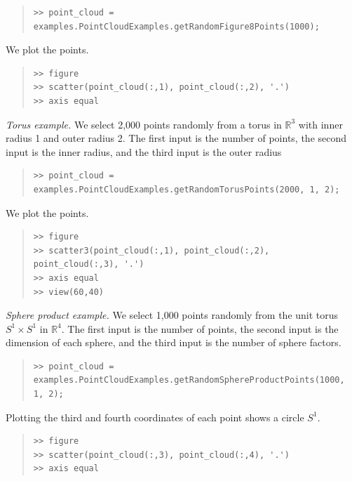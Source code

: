 \documentclass[amscd, amssymb, verbatim]{amsart}[12pt]
\theoremstyle{remark}
\theoremstyle{remark}
\theoremstyle{remark}
\begin{document}
\begin{quote} \begin{verbatim}
>> point_cloud = examples.PointCloudExamples.getRandomFigure8Points(1000);
\end{verbatim} \end{quote}

We plot the points.

\begin{quote} \begin{verbatim}
>> figure
>> scatter(point_cloud(:,1), point_cloud(:,2), '.')
>> axis equal
\end{verbatim} \end{quote}

{\em Torus example.} We select 2,000 points randomly from a torus in $\mathbb{R}^3$ with inner radius 1 and outer radius 2. The first input is the number of points, the second input is the inner radius, and the third input is the outer radius

\begin{quote} \begin{verbatim}
>> point_cloud = examples.PointCloudExamples.getRandomTorusPoints(2000, 1, 2);
\end{verbatim} \end{quote}

We plot the points.

\begin{quote} \begin{verbatim}
>> figure
>> scatter3(point_cloud(:,1), point_cloud(:,2), point_cloud(:,3), '.')
>> axis equal
>> view(60,40)
\end{verbatim} \end{quote}

{\em Sphere product example.} We select 1,000 points randomly from the unit torus $S^1 \times S^1$ in $\mathbb{R}^4$. The first input is the number of points, the second input is the dimension of each sphere, and the third input is the number of sphere factors.

\begin{quote} \begin{verbatim}
>> point_cloud = examples.PointCloudExamples.getRandomSphereProductPoints(1000, 1, 2);
\end{verbatim} \end{quote}

Plotting the third and fourth coordinates of each point shows a circle $S^1$.

\begin{quote} \begin{verbatim}
>> figure
>> scatter(point_cloud(:,3), point_cloud(:,4), '.')
>> axis equal
\end{verbatim} \end{quote}
\end{document}
